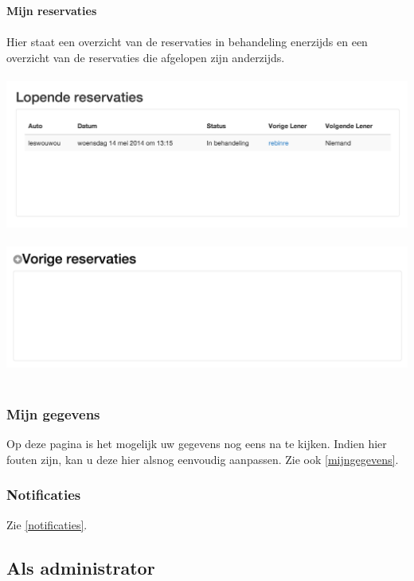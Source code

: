 \documentclass[11pt,a4paper,oneside]{article}
\begin{document}
{\large{\textbf{Mijn reservaties}}} \\\\
Hier staat een overzicht van de reservaties in behandeling enerzijds en een overzicht van de reservaties die afgelopen zijn anderzijds. \\\\
\includegraphics[scale=0.5]{img/lopende} \\\\

\includegraphics[scale=0.5]{img/vorige} \\\\
\subsubsection{Mijn gegevens}
Op deze pagina is het mogelijk uw gegevens nog eens na te kijken. Indien hier fouten zijn, kan u deze hier alsnog eenvoudig aanpassen. Zie ook \ref{mijngegevens}.
\subsubsection{Notificaties}
Zie \ref{notificaties}.

\subsection{Als administrator}
\end{document}
